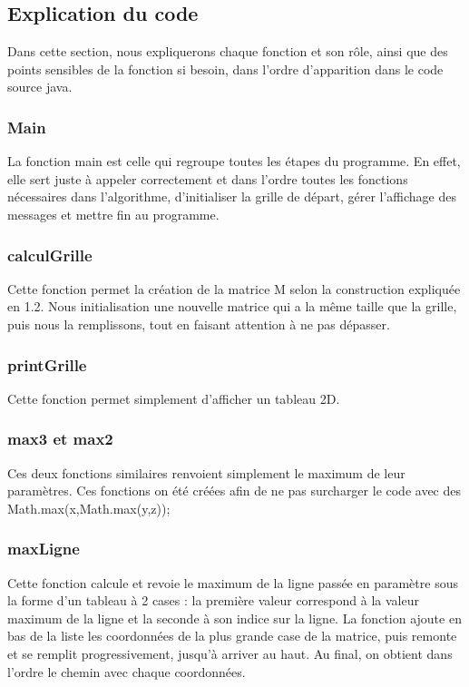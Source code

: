 \documentclass[12pt]{article}
\begin{document}
\subsection{Explication du code}
Dans cette section, nous expliquerons chaque fonction et son rôle, ainsi que des points sensibles de la fonction si besoin, dans l'ordre d'apparition dans le code source java.

\subsubsection{Main}
La fonction main est celle qui regroupe toutes les étapes du programme. En effet, elle sert juste à appeler correctement et dans l'ordre toutes les fonctions nécessaires dans l'algorithme, d'initialiser la grille de départ, gérer l'affichage des messages et mettre fin au programme.

\subsubsection{calculGrille}
Cette fonction permet la création de la matrice M selon la construction expliquée en 1.2. Nous initialisation une nouvelle matrice qui a la même taille que la grille, puis nous la remplissons, tout en faisant attention à ne pas dépasser.

\subsubsection{printGrille}
Cette fonction permet simplement d'afficher un tableau 2D.

\subsubsection{max3 et max2}
Ces deux fonctions similaires renvoient simplement le maximum de leur paramètres. Ces fonctions on été créées afin de ne pas surcharger le code avec des Math.max(x,Math.max(y,z));

\subsubsection{maxLigne}
Cette fonction calcule et revoie le maximum de la ligne passée en paramètre sous la forme d'un tableau à 2 cases : la première valeur correspond à la valeur maximum de la ligne et la seconde à son indice sur la ligne.
La fonction ajoute en bas de la liste les coordonnées de la plus grande case de la matrice, puis remonte et se remplit progressivement, jusqu'à arriver au haut. Au final, on obtient dans l'ordre le chemin avec chaque coordonnées.
\end{document}
